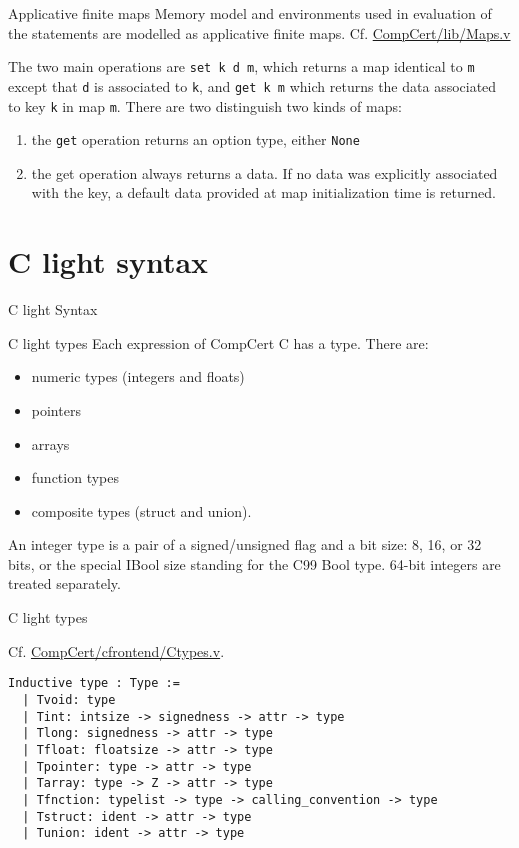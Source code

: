 \documentclass{beamer}
\begin{document}
\begin{frame}{Applicative finite maps}
  Memory model and environments used in evaluation of the statements are modelled as applicative finite maps. Cf. \url{CompCert/lib/Maps.v}

  \bigskip
  The two main operations are \texttt{set k d m}, which returns a map identical to \texttt{m} except that \texttt{d}
  is associated to \texttt{k}, and \texttt{get k m} which returns the data associated
  to key \texttt{k} in map \texttt{m}.  There are two distinguish two kinds of maps:
  \begin{enumerate}
\item  the \texttt{get} operation returns an option type, either \texttt{None} 
  \item 
the {get} operation always returns a data.  If no data was explicitly
  associated with the key, a default data provided at map initialization time
  is returned.
  \end{enumerate}
  \end{frame}


\section{C light syntax}
\begin{frame}
  \begin{center}
    \huge C light Syntax
    \end{center}
  \end{frame}


\begin{frame}{C light types}
  Each expression of CompCert C has a type. There are:
  \begin{itemize}
   \item numeric types (integers and floats)
   \item pointers
   \item arrays
   \item function types
     \item composite types (struct and union).
 \end{itemize}
  An integer type is a pair of a signed/unsigned
  flag and a bit size: 8, 16, or 32 bits, or the special IBool size
  standing for the C99 Bool type.  64-bit integers are treated separately.
  

\end{frame}

\begin{frame}[fragile]{C light types}

  Cf. \url{CompCert/cfrontend/Ctypes.v}. 
  \begin{lstlisting}[language=Coq]
 Inductive type : Type :=
  | Tvoid: type 
  | Tint: intsize -> signedness -> attr -> type 
  | Tlong: signedness -> attr -> type 
  | Tfloat: floatsize -> attr -> type 
  | Tpointer: type -> attr -> type       
  | Tarray: type -> Z -> attr -> type              
  | Tfnction: typelist -> type -> calling_convention -> type   
  | Tstruct: ident -> attr -> type                 
  | Tunion: ident -> attr -> type                 
\end{lstlisting}


\end{frame}
\end{document}

